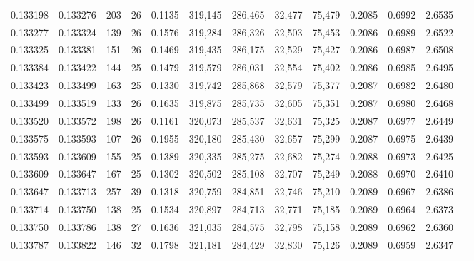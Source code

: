 \begin{tabular}{rrrrrrrrrrrrr}
0.133198 & 0.133276 & 203 &  26 &                                     0.1135 & 319,145 & 286,465 &  32,477 &  75,479 & 0.2085 & 0.6992 & 2.6535 \\
0.133277 & 0.133324 & 139 &  26 &                                     0.1576 & 319,284 & 286,326 &  32,503 &  75,453 & 0.2086 & 0.6989 & 2.6522 \\
0.133325 & 0.133381 & 151 &  26 &                                     0.1469 & 319,435 & 286,175 &  32,529 &  75,427 & 0.2086 & 0.6987 & 2.6508 \\
0.133384 & 0.133422 & 144 &  25 &                                     0.1479 & 319,579 & 286,031 &  32,554 &  75,402 & 0.2086 & 0.6985 & 2.6495 \\
0.133423 & 0.133499 & 163 &  25 &                                     0.1330 & 319,742 & 285,868 &  32,579 &  75,377 & 0.2087 & 0.6982 & 2.6480 \\
0.133499 & 0.133519 & 133 &  26 &                                     0.1635 & 319,875 & 285,735 &  32,605 &  75,351 & 0.2087 & 0.6980 & 2.6468 \\
0.133520 & 0.133572 & 198 &  26 &                                     0.1161 & 320,073 & 285,537 &  32,631 &  75,325 & 0.2087 & 0.6977 & 2.6449 \\
0.133575 & 0.133593 & 107 &  26 &                                     0.1955 & 320,180 & 285,430 &  32,657 &  75,299 & 0.2087 & 0.6975 & 2.6439 \\
0.133593 & 0.133609 & 155 &  25 &                                     0.1389 & 320,335 & 285,275 &  32,682 &  75,274 & 0.2088 & 0.6973 & 2.6425 \\
0.133609 & 0.133647 & 167 &  25 &                                     0.1302 & 320,502 & 285,108 &  32,707 &  75,249 & 0.2088 & 0.6970 & 2.6410 \\
0.133647 & 0.133713 & 257 &  39 &                                     0.1318 & 320,759 & 284,851 &  32,746 &  75,210 & 0.2089 & 0.6967 & 2.6386 \\
0.133714 & 0.133750 & 138 &  25 &                                     0.1534 & 320,897 & 284,713 &  32,771 &  75,185 & 0.2089 & 0.6964 & 2.6373 \\
0.133750 & 0.133786 & 138 &  27 &                                     0.1636 & 321,035 & 284,575 &  32,798 &  75,158 & 0.2089 & 0.6962 & 2.6360 \\
0.133787 & 0.133822 & 146 &  32 &                                     0.1798 & 321,181 & 284,429 &  32,830 &  75,126 & 0.2089 & 0.6959 & 2.6347 \\

\end{tabular}
